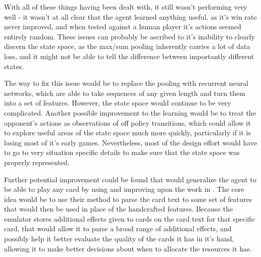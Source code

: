 With all of these things having been dealt with, it still wasn't performing very well - it wasn't at all clear that the agent learned anything useful, as it's win rate never improved, and when tested against a human player it's actions seemed entirely random. These issues can probably be ascribed to it's inability to clearly discern the state space, as the max/sum pooling inherently carries a lot of data loss, and it might not be able to tell the difference between importantly different states.

The way to fix this issue would be to replace the pooling with recurrent neural networks, which are able to take sequences of any given length and turn them into a set of features. However, the state space would continue to be very complicated. Another possible improvement to the learning would be to treat the opponent's actions as observations of off policy transitions, which could allow it to explore useful areas of the state space much more quickly, particularly if it is losing most of it's early games. Nevertheless, most of the design effort would have to go to very situation specific details to make sure that the state space was properly represented.

Further potential improvement could be found that would generalize the agent to be able to play any card by using and improving upon the work in \cite{deepmind:mtg}. The core idea would be to use their method to parse the card text to some set of features that would then be used in place of the handcrafted features. Because the emulator stores additional effects given to cards on the card text for that specific card, that would allow it to parse a broad range of additional effects, and possibly help it better evaluate the quality of the cards it has in it's hand, allowing it to make better decisions about when to allocate the resources it has.